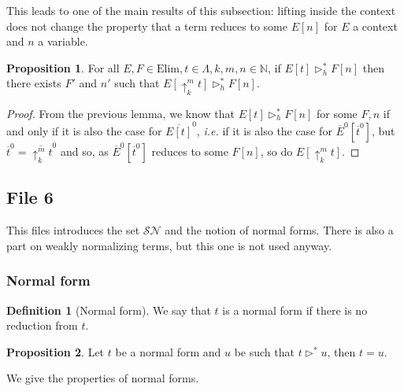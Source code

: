 \documentclass{article}
\newcommand{\SN}[0]{\mathcal{SN}}
\newcommand{\bN}[0]{\mathbb N}
\newcommand{\lift}[2]{\uparrow_{#1}^{#2}}
\newcommand{\Elim}[0]{\mathrm{Elim}}
\newcommand{\flatten}[2]{\overline{#1}^{#2}}
\theoremstyle{definition}
\newtheorem{defi}{Definition}
\newtheorem{prop}{Proposition}[subsection]
\begin{document}
This leads to one of the main results of this subsection: lifting inside the context does not change the
property that a term reduces to some $E[n]$ for $E$ a context and $n$ a variable.

\begin{prop}
    For all $E,F\in\Elim, t\in\Lambda, k,m,n\in\bN$, if $E[t] \rhd_h^* F[n]$ then there exists $F'$ and $n'$
    such that $E[\lift k m t]\rhd_h^* F [n]$.
\end{prop}

\begin{proof}
    From the previous lemma, we know that $E[t] \rhd_h^* F[n]$ for some $F,n$ if and only if it is also the
    case for $\flatten {E[t]} 0$, \textit{i.e.} if it is also the case for $\flatten E 0 [\flatten t 0]$,
    but $\flatten t 0 = \flatten {\lift k m t} 0$ and so, as $\flatten E 0 [\flatten t 0]$ reduces to some
    $F[n]$, so do $E[\lift k m t]$.
\end{proof}

\subsection{File 6}

This files introduces the set $\SN$ and the notion of normal forms. There is also a part on weakly normalizing
terms, but this one is not used anyway.

\subsubsection{Normal form}

\begin{defi}[Normal form]
    We say that $t$ is a normal form if there is no reduction from $t$.
\end{defi}

\begin{prop}
    Let $t$ be a normal form and $u$ be such that $t \rhd^* u$, then $t = u$.
\end{prop}

We give the properties of normal forms.
\end{document}
